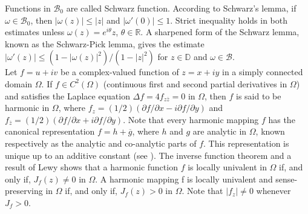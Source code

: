 \documentclass[12pt,reqno]{amsart}
\newtheorem{open problem}{Open problem}[section]
\newcommand{\pa}{\partial}
\newcommand{\ol}{\overline}
\numberwithin{equation}{section}
\begin{document}
Functions in $\mathcal{B}_0$ are called Schwarz function. According to Schwarz's lemma, if $\omega\in\mathcal{B}_0$, then $|\omega(z)|\leq |z|$ and $|\omega'(0)|\leq 1$. 
Strict inequality holds in both estimates unless $\omega(z)=e^{i\theta}z$, $\theta\in\mathbb{R}$. A sharpened form of the Schwarz lemma, known as the Schwarz-Pick lemma, 
gives the estimate  $|\omega'(z)|\leq (1-|\omega(z)|^2)/(1-|z|^2)$ for $z\in\mathbb{D}$ and $\omega\in\mathcal{B}$. \\[2mm]
\indent Let $f = u+i v$ be a complex-valued function of $z =x +i y$ in a simply connected domain $\Omega$. If $f\in C^2(\Omega)$ (continuous first and second partial derivatives in 
 $\Omega$) and satisfies the Laplace equation $\Delta f = 4 f_{z\ol{z}}=0$ in $\Omega$, then $f$ is said to be harmonic in $\Omega$, where 
$f_z=(1/2)(\pa f/\pa x -i \pa f/\pa y)$ and $f_{\ol{z}}=(1/2)(\pa f/\pa x +i \pa f/\pa y)$. Note that every harmonic
 mapping $f$ has the canonical representation $f =h +\ol{g}$, where $h$ and $g$ are analytic in $\Omega$, known respectively as the analytic and co-analytic parts of $f$. 
 This representation is unique up to an additive constant (see \cite{D2004}). The inverse function theorem and a result of Lewy \cite{L1936} shows that a harmonic
 function $f$ is locally univalent in $\Omega$ if, and only if, $J_f(z)\not= 0$ in $\Omega$. A harmonic mapping f is locally univalent
 and sense-preserving in $\Omega$ if, and only if, $J_f(z)> 0$ in $\Omega$. Note that $|f_z|\not=0$ whenever $J_f>0$. 
\end{document}
